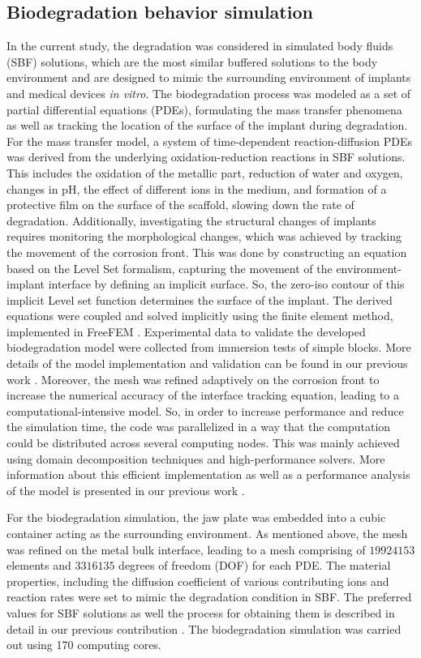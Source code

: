 \subsection{Biodegradation behavior simulation}

In the current study, the degradation was considered in simulated body fluids (SBF) solutions, which are the most similar buffered solutions to the body environment and are designed to mimic the surrounding environment of implants and medical devices \textit{in vitro}. The biodegradation process was modeled as a set of partial differential equations (PDEs), formulating the mass transfer phenomena as well as tracking the location of the surface of the implant during degradation. For the mass transfer model, a system of time-dependent reaction-diffusion PDEs was derived from the underlying oxidation-reduction reactions in SBF solutions. This includes the oxidation of the metallic part, reduction of water and oxygen, changes in pH, the effect of different ions in the medium, and formation of a protective film on the surface of the scaffold, slowing down the rate of degradation. Additionally, investigating the structural changes of implants requires monitoring the morphological changes, which was achieved by tracking the movement of the corrosion front. This was done by constructing an equation based on the Level Set formalism, capturing the movement of the environment-implant interface by defining an implicit surface. So, the zero-iso contour of this implicit Level set function determines the surface of the implant. The derived equations were coupled and solved implicitly using the finite element method, implemented in FreeFEM \cite{Hecht2012}. Experimental data to validate the developed biodegradation model were collected from immersion tests of simple blocks. More details of the model implementation and validation can be found in our previous work \cite{Barzegari2021}. Moreover, the mesh was refined adaptively on the corrosion front to increase the numerical accuracy of the interface tracking equation, leading to a computational-intensive model. So, in order to increase performance and reduce the simulation time, the code was parallelized in a way that the computation could be distributed across several computing nodes. This was mainly achieved using domain decomposition techniques and high-performance solvers. More information about this efficient implementation as well as a performance analysis of the model is presented in our previous work \cite{Barzegari2022}.

For the biodegradation simulation, the jaw plate was embedded into a cubic container acting as the surrounding environment. As mentioned above, the mesh was refined on the metal bulk interface, leading to a mesh comprising of $\num{19924153}$ elements and $\num{3316135}$ degrees of freedom (DOF) for each PDE. The material properties, including the diffusion coefficient of various contributing ions and reaction rates were set to mimic the degradation condition in SBF. The preferred values for SBF solutions as well the process for obtaining them is described in detail in our previous contribution \cite{Barzegari2021}. The biodegradation simulation was carried out using 170 computing cores.

